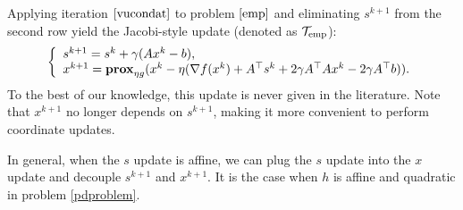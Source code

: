 {{%
Applying iteration $\eqref{vucondat}$ to problem $\eqref{emp}$ and eliminating $s^{k+1}$ from the second row yield the Jacobi-style update (denoted as ${\mathcal{T}}_\textnormal{emp}$):
\begin{equation}
\left\{
\begin{array}{l}
s^{k+1}=s^k+\gamma (Ax^k-b),\\
x^{k+1}=\prox_{\eta g}(x^k-\eta(\nabla f(x^k)+A^\top s^k+2\gamma A^\top Ax^k-2\gamma A^\top b)).
\end{array}
\right.\label{pdemp}
\end{equation}
To the best of our knowledge, this update is never given in the literature. Note that $x^{k+1}$ no longer depends on $s^{k+1}$, making it more convenient to perform coordinate updates. 
%
\begin{remark}
In general, when the $s$ update is affine, we can plug the $s$ update into the $x$ update and decouple $s^{k+1}$ and $x^{k+1}$. It is the case when $h$ is affine and quadratic in problem \eqref{pdproblem}.

\end{remark}}}
